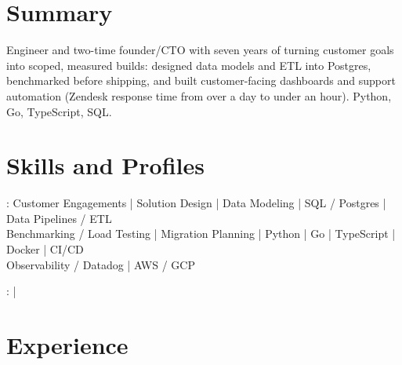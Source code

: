 \documentclass[print]{jack-resume}
\begin{document}
\pagecolor{darkmodeBackground}


\begin{minipage}[t][1cm][t]{.03\textwidth}
    \hfill
\end{minipage}

\section{Summary}
Engineer and two-time founder/CTO with seven years of turning customer goals into scoped, measured builds: designed data models and ETL into Postgres, benchmarked before shipping, and built customer-facing dashboards and support automation (Zendesk response time from over a day to under an hour). Python, Go, TypeScript, SQL.
\sectionsep

\section{Skills and Profiles}
:
Customer Engagements \hfill | \hfill
Solution Design \hfill | \hfill
Data Modeling \hfill | \hfill
SQL / Postgres \hfill | \hfill
Data Pipelines / ETL \\
\hspace{1.0cm} Benchmarking / Load Testing \hfill | \hfill
Migration Planning \hfill | \hfill
Python \hfill | \hfill
Go \hfill | \hfill
TypeScript \hfill | \hfill
Docker \hfill | \hfill
CI/CD \\
\hspace{1.0cm} Observability / Datadog \hfill | \hfill
AWS / GCP \\

\raggedright{
    :
      \href{https://www.linkedin.com/in/jack-sturtevant/}{ \ExternalLink} |
     \href{https://github.com/jacksturt}{ \ExternalLink}}

\section{Experience}
\end{document}
